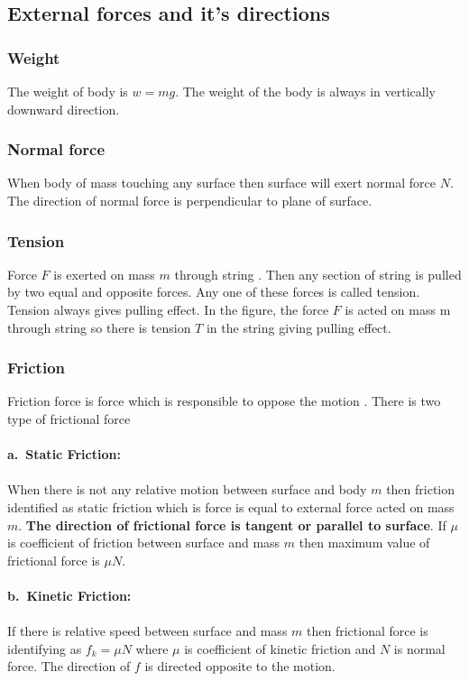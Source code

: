 \subsection{External forces and it's directions}
\subsubsection{Weight}
The weight of body is $w=m g$. The weight of the body is always in vertically
downward direction.
\subsubsection{Normal force} 
When body of mass touching any surface then surface will exert normal force $N$. The direction of normal force is perpendicular to plane of surface.


\subsubsection{Tension}
Force $F$ is exerted on mass $m$ through string . Then any section of string is pulled by two equal and opposite forces. Any one of these forces is called tension. Tension always gives pulling effect. In the figure, the force $F$ is acted on mass $\mathrm{m}$ through string so there is tension $T$ in the string giving pulling effect.
\subsubsection{Friction}
Friction force is force which is responsible to oppose the motion .
There is two type of frictional force\\\\
\textbf{a.\ Static Friction:} \\\\When there is not any relative motion between surface and body $m$ then friction identified as static friction which is force is equal to external force acted on mass $m$. \textbf{The direction of frictional force is tangent or parallel to surface}. If $\mu$ is coefficient of
friction between surface and mass $m$ then maximum value of frictional force is $\mu N$.
\\\\
\textbf{b.\ Kinetic Friction:} \\\\If there is relative speed between surface and mass $m$ then frictional force is identifying as $f_{k}=\mu N$ where $\mu$ is coefficient of kinetic friction and $N$ is normal force. The direction of $f$ is directed opposite to the motion.

